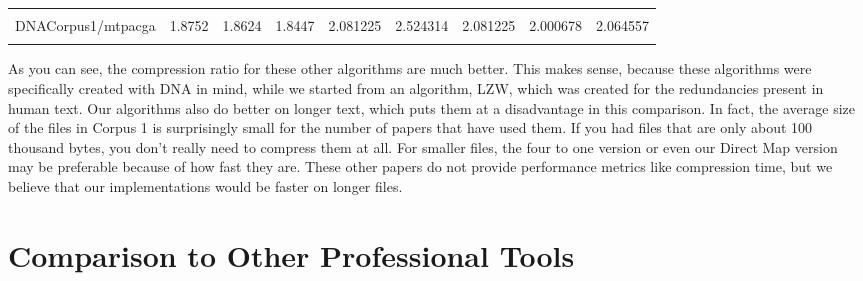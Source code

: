 \documentclass[12pt,twoside]{reedthesis}
\begin{document}
\begin{table}[!h]
{\begin{tabular}[t]{lrrrrrrrr}
\cellcolor{gray!6}{DNACorpus1/mpomtcg} & \cellcolor{gray!6}{1.9378} & \cellcolor{gray!6}{1.9058} & \cellcolor{gray!6}{1.8768} & \cellcolor{gray!6}{2.172671} & \cellcolor{gray!6}{2.485925} & \cellcolor{gray!6}{2.172671} & \cellcolor{gray!6}{2.000375} & \cellcolor{gray!6}{2.053449}\\
DNACorpus1/mtpacga & 1.8752 & 1.8624 & 1.8447 & 2.081225 & 2.524314 & 2.081225 & 2.000678 & 2.064557\\
\addlinespace
\cellcolor{gray!6}{DNACorpus1/vaccg} & \cellcolor{gray!6}{1.7614} & \cellcolor{gray!6}{1.7614} & \cellcolor{gray!6}{1.7649} & \cellcolor{gray!6}{2.108805} & \cellcolor{gray!6}{2.413347} & \cellcolor{gray!6}{2.108805} & \cellcolor{gray!6}{2.000365} & \cellcolor{gray!6}{2.065162}\\
\bottomrule
\end{tabular}}
\end{table}
As you can see, the compression ratio for these other algorithms are much better. This makes sense, because these algorithms were specifically created with DNA in mind, while we started from an algorithm, LZW, which was created for the redundancies present in human text. Our algorithms also do better on longer text, which puts them at a disadvantage in this comparison. In fact, the average size of the files in Corpus 1 is surprisingly small for the number of papers that have used them. If you had files that are only about 100 thousand bytes, you don't really need to compress them at all. For smaller files, the four to one version or even our Direct Map version may be preferable because of how fast they are. These other papers do not provide performance metrics like compression time, but we believe that our implementations would be faster on longer files.

\hypertarget{comparison-to-other-professional-tools}{%
\section{Comparison to Other Professional Tools}\label{comparison-to-other-professional-tools}}
\end{document}
